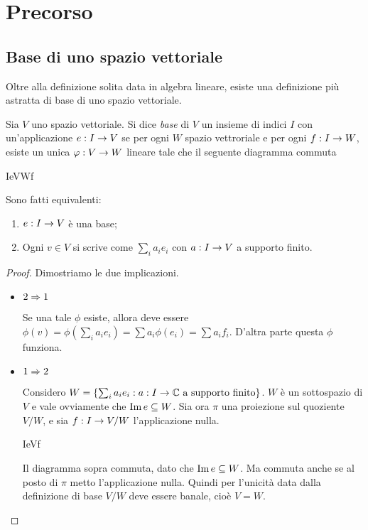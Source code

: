\section{Precorso}

\subsection{Base di uno spazio vettoriale}
  Oltre alla definizione solita data in algebra lineare, esiste una definizione più astratta di base di uno spazio vettoriale.
  \begin{mydef}
    Sia $V$ uno spazio vettoriale. Si dice \emph{base} di $V$ un insieme di indici $I$ con un'applicazione $e: I \rightarrow V$ se per ogni $W$ spazio vettroriale e per ogni $f: I \rightarrow W$, esiste un unica $\varphi: V \rightarrow W$ lineare tale che il seguente diagramma commuta

    	\tridiag IeV\phi Wf

  \end{mydef}

  \begin{myprop}
    Sono fatti equivalenti:
    \begin{enumerate}
    \item $e: I \rightarrow V$ è una base;
    \item Ogni $v \in V$ si scrive come $\sum_i a_ie_i$ con $a: I\rightarrow V$ a supporto finito. 
    \end{enumerate}
  \end{myprop}
  \begin{proof}
    Dimostriamo le due implicazioni.
    \begin{itemize}
      \item $2\Rightarrow 1$
      
      Se una tale $\phi$ esiste, allora deve essere $\phi(v)=\phi(\sum_i a_i e_i) = \sum a_i \phi(e_i) = \sum a_i f_i$. D'altra parte questa $\phi$ funziona.
      
      \item $1 \Rightarrow 2$
      
      Considero $W = \{\sum_i a_ie_i : a:I\rightarrow \mathbb C \mbox{ a supporto finito}\}$. $W$ è un sottospazio di $V$ e vale ovviamente che $\operatorname{Im} e \subseteq W$. Sia ora $\pi$ una proiezione sul quoziente $V/W$, e sia $f: I \rightarrow V/W$ l'applicazione nulla.
	
	\tridiag IeVf
      
      Il diagramma sopra commuta, dato che $\operatorname{Im} e \subseteq W$. Ma commuta anche se al posto di $\pi$ metto l'applicazione nulla. Quindi per l'unicità data dalla definizione di base $V/W$ deve essere banale, cioè $V=W$.
    \end{itemize}
  \end{proof}
  
